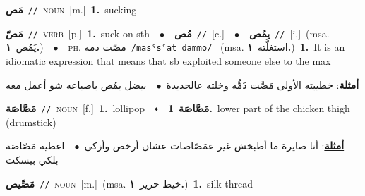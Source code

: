 \documentclass[10pt,a4paper,twoside]{article} %
\begin{document}
\begin{multicols}{2}
{\setlength\topsep{0pt}\textbf{\foreignlanguage{arabic}{مَص}}\ {\color{gray}\texttt{//}\color{black}}\ \textsc{noun}\ [m.]\ \textbf{1.}~sucking\ } \vspace{2mm}

{\setlength\topsep{0pt}\textbf{\foreignlanguage{arabic}{مَصّ}}\ {\color{gray}\texttt{//}\color{black}}\ \textsc{verb}\ [p.]\ \textbf{1.}~suck on sth\ \ $\bullet$\ \ \setlength\topsep{0pt}\textbf{\foreignlanguage{arabic}{مُص}}\ {\color{gray}\texttt{//}\color{black}}\ [c.]\ \ $\bullet$\ \ \setlength\topsep{0pt}\textbf{\foreignlanguage{arabic}{يمُص}}\ {\color{gray}\texttt{//}\color{black}}\ [i.]\ \color{gray}(msa. \foreignlanguage{arabic}{يَمُص}~\foreignlanguage{arabic}{\textbf{١.}})\color{black}\ \ $\bullet$\ \ \textsc{ph.} \color{gray} \foreignlanguage{arabic}{مصّت دمه}\color{black}\ {\color{gray}\texttt{/{\sffamily masˤsˤat dammo}/}\color{black}}\ \color{gray} (msa. \foreignlanguage{arabic}{استغلَّته}~\foreignlanguage{arabic}{\textbf{١.}})\color{black}\ \textbf{1.}~It is an idiomatic expression that means that sb exploited someone else to the max\  \begin{flushright}\color{gray}\foreignlanguage{arabic}{\textbf{\underline{\foreignlanguage{arabic}{أمثلة}}}: خطيبته الأولى مَصَّت دَمُّه وخلته عالحديدة\ $\bullet$\ \  بيضل يمُص باصباعه شو أعمل معه}\end{flushright}\color{black}} \vspace{2mm}

{\setlength\topsep{0pt}\textbf{\foreignlanguage{arabic}{مَصَّاصَة}}\ {\color{gray}\texttt{//}\color{black}}\ \textsc{noun}\ [f.]\ \textbf{1.}~lollipop\ \ $\smblkdiamond$\ \ \setlength\topsep{0pt}\textbf{\foreignlanguage{arabic}{مَصَّاصَة}}\ \textbf{1.}~lower part of the chicken thigh (drumstick)\  \begin{flushright}\color{gray}\foreignlanguage{arabic}{\textbf{\underline{\foreignlanguage{arabic}{أمثلة}}}: أنا صايرة ما أطبخش غير عمَصّاصات عشان أرخص وأزكى\ $\bullet$\ \  اعطيه مَصّاصَة بلكي بيسكت}\end{flushright}\color{black}} \vspace{2mm}

{\setlength\topsep{0pt}\textbf{\foreignlanguage{arabic}{مَصِّيص}}\ {\color{gray}\texttt{//}\color{black}}\ \textsc{noun}\ [m.]\ \color{gray}(msa. \foreignlanguage{arabic}{خيط حرير}~\foreignlanguage{arabic}{\textbf{١.}})\color{black}\ \textbf{1.}~silk thread\ } \vspace{2mm}


\end{multicols}
\end{document}
